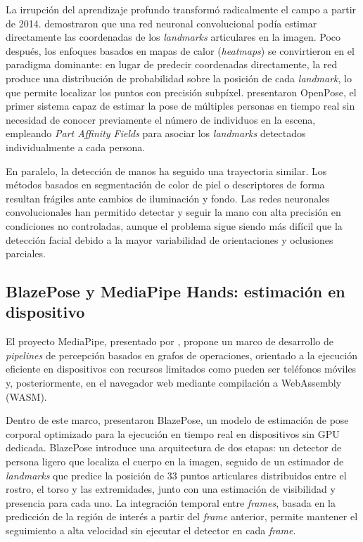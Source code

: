 \documentclass[12pt]{report} %
\begin{document}
La irrupción del aprendizaje profundo transformó radicalmente el campo a partir de 2014. \citet{toshev2014deeppose} demostraron que una red neuronal convolucional podía estimar directamente las coordenadas de los \textit{landmarks} articulares en la imagen. Poco después, los enfoques basados en mapas de calor (\textit{heatmaps}) se convirtieron en el paradigma dominante: en lugar de predecir coordenadas directamente, la red produce una distribución de probabilidad sobre la posición de cada \textit{landmark}, lo que permite localizar los puntos con precisión subpíxel. \citet{cao2017realtime} presentaron OpenPose, el primer sistema capaz de estimar la pose de múltiples personas en tiempo real sin necesidad de conocer previamente el número de individuos en la escena, empleando \textit{Part Affinity Fields} para asociar los \textit{landmarks} detectados individualmente a cada persona.

En paralelo, la detección de manos ha seguido una trayectoria similar. Los métodos basados en segmentación de color de piel o descriptores de forma resultan frágiles ante cambios de iluminación y fondo. Las redes neuronales convolucionales han permitido detectar y seguir la mano con alta precisión en condiciones no controladas, aunque el problema sigue siendo más difícil que la detección facial debido a la mayor variabilidad de orientaciones y oclusiones parciales.

\subsection{BlazePose y MediaPipe Hands: estimación en dispositivo}

El proyecto MediaPipe, presentado por \citet{lugaresi2019mediapipe}, propone un marco de desarrollo de \textit{pipelines} de percepción basados en grafos de operaciones, orientado a la ejecución eficiente en dispositivos con recursos limitados como pueden ser teléfonos móviles y, posteriormente, en el navegador web mediante compilación a WebAssembly (WASM).

Dentro de este marco, \citet{bazarevsky2020blazepose} presentaron BlazePose, un modelo de estimación de pose corporal optimizado para la ejecución en tiempo real en dispositivos sin GPU dedicada. BlazePose introduce una arquitectura de dos etapas: un detector de persona ligero que localiza el cuerpo en la imagen, seguido de un estimador de \textit{landmarks} que predice la posición de 33 puntos articulares distribuidos entre el rostro, el torso y las extremidades, junto con una estimación de visibilidad y presencia para cada uno. La integración temporal entre \textit{frames}, basada en la predicción de la región de interés a partir del \textit{frame} anterior, permite mantener el seguimiento a alta velocidad sin ejecutar el detector en cada \textit{frame}.
\end{document}
